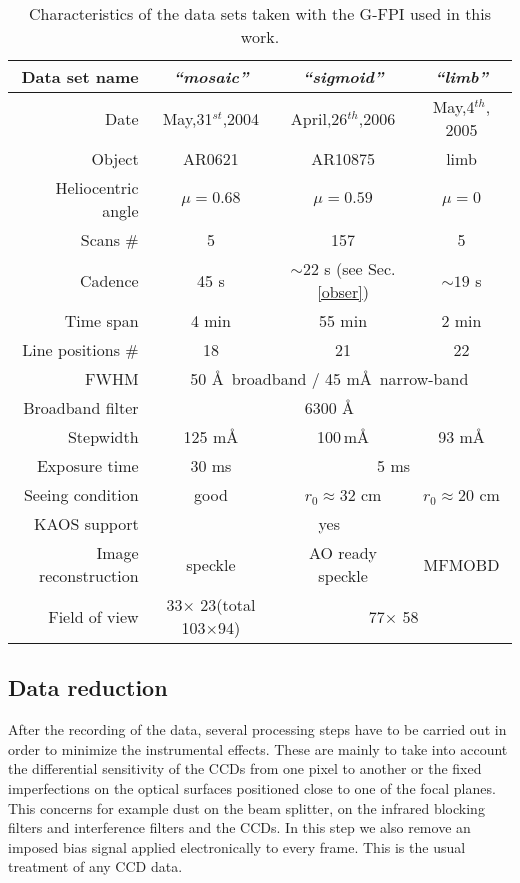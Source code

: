 \begin{table}[b]
\begin{center}\begin{tabular}{|r|c|c|c|}\hline
\textbf{ Data set name}  & \textit{``mosaic''} & \textit{``sigmoid''} & \textit{``limb''} \\\hline\hline
  Date			 & May,31$^{st} $,2004  &  April,26$^{th} $,2006 & May,4$^{th}$, 2005  \\\hline 
  Object			  & AR0621  & AR10875  & limb  \\\hline 
  Heliocentric angle	 & $\mu=0.68$  &$\mu=0.59$  & $\mu=0$  \\\hline 
  Scans \#			 & 5  & 157  & 5  \\\hline 
  Cadence			 & 45 s  & $\sim22$ s (see Sec. \ref{obser})  & $\sim19$ s  \\\hline 
  Time span  		 & 4 min  & 55 min  & 2 min  \\\hline 
  Line positions	\#	&  18 & 21 & 22  \\\hline
  FWHM 			& \multicolumn{3}{|c|}{50 \AA\, broadband / 45 m\AA\, narrow-band}  \\\hline   
  Broadband filter  & \multicolumn{3}{|c|}{6300 \AA}   \\\hline  
  Stepwidth		& 125 m\AA  & 100\,m\AA & 93 m\AA  \\\hline   
  Exposure time	& 30 ms  &  \multicolumn{2}{|c|}{5 ms} \\\hline   
  Seeing condition	& good  & $r_{0} \approx 32$ cm  & $r_{0} \approx 20$ cm  \\\hline   
 KAOS support & \multicolumn{3}{|c|}{yes}  \\\hline 
  Image reconstruction& speckle & AO ready speckle  &  MFMOBD  \\\hline 
   Field of view		 & 33\arcsec $\times$ 23\arcsec (total 103\arcsec $\times$94\arcsec  )  &  \multicolumn{2}{|c|}{77\arcsec $\times$ 58\arcsec}  \\\hline 
   
  \end{tabular} \caption{Characteristics of the data sets taken with the G-FPI used in this work.\label{table:obs:HRb}}
\end{center}
\end{table}


 
\subsection{Data reduction\label{datared}}
After the recording of the data, several processing steps have to be carried out in order to minimize the instrumental effects. These are mainly to take into account the differential sensitivity of the CCDs from one pixel to another or the fixed imperfections on the optical surfaces positioned close to one of the focal planes. This concerns for example dust on the beam splitter, on the infrared blocking filters and interference filters and the CCDs. In this step we also remove an imposed bias signal applied electronically to every frame. This is the usual treatment of any CCD data.

